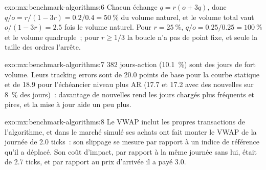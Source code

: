 \begin{solution}{exo:mx:benchmark-algorithms:6}
Chacun échange $q=r(o+3q)$, donc $q/o=r/(1-3r)=0.2/0.4=50~\%$ du volume naturel, et le volume total vaut $o/(1-3r)=2.5$ fois le volume naturel. Pour
$r=25~\%$, $q/o=0.25/0.25=100~\%$ et le volume quadruple~; pour $r\ge1/3$ la boucle n'a pas de point fixe, et seule la taille des ordres l'arrête.
\end{solution}

\begin{solution}{exo:mx:benchmark-algorithms:7}
382 jours-action (10.1~\%) sont des jours de fort volume. Leurs tracking errors sont de 20.0 points de base pour la courbe statique et de 18.9 pour l'échéancier niveau plus AR
(17.7 et 17.2 avec des nouvelles sur 8~\% des jours)~: davantage de nouvelles rend les jours chargés plus fréquents et pires, et la mise à jour aide un peu plus.
\end{solution}

\begin{solution}{exo:mx:benchmark-algorithms:8}
Le VWAP inclut les propres transactions de l'algorithme, et dans le marché simulé ses achats ont fait monter le VWAP de la journée de 2.0 ticks~: son slippage se mesure
par rapport à un indice de référence qu'il a déplacé. Son coût d'impact, par rapport à la même journée sans lui, était de 2.7 ticks, et par rapport au prix d'arrivée il a payé 3.0.
\end{solution}

